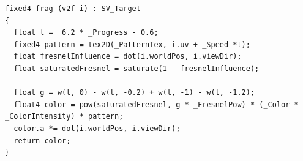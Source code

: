 \begin{lstlisting}[caption=Fragment shadera odpowiedzialny za animację]
fixed4 frag (v2f i) : SV_Target
{
  float t =  6.2 * _Progress - 0.6;
  fixed4 pattern = tex2D(_PatternTex, i.uv + _Speed *t);
  float fresnelInfluence = dot(i.worldPos, i.viewDir);
  float saturatedFresnel = saturate(1 - fresnelInfluence);

  float g = w(t, 0) - w(t, -0.2) + w(t, -1) - w(t, -1.2);
  float4 color = pow(saturatedFresnel, g * _FresnelPow) * (_Color * _ColorIntensity) * pattern;
  color.a *= dot(i.worldPos, i.viewDir);
  return color;
}
\end{lstlisting}
